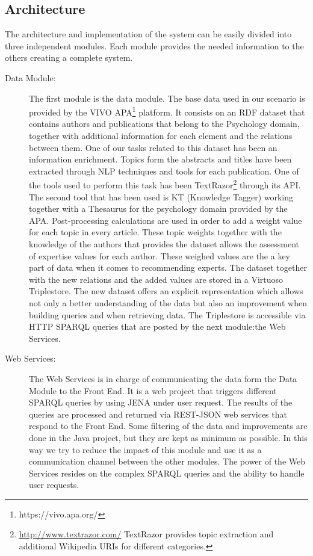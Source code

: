 \subsection{Architecture}
The architecture and implementation of the system can be easily divided into three independent modules. Each module provides the needed information to the others creating a complete system.
\begin{description}
  \item[Data Module:] The first module is the data module. The base data used in our scenario is provided by the VIVO APA\footnote{\url{}https://vivo.apa.org/} platform. It consists on an RDF dataset that contains authors and publications that belong to the Psychology domain, together with additional information for each element and the relations between them. One of our tasks related to this dataset has been an information enrichment. Topics form the abstracts and titles have been extracted through NLP techniques and tools for each publication. One of the tools used to perform this task has been TextRazor\footnote{\url{http://www.textrazor.com/} TextRazor provides topic extraction and additional Wikipedia URIs for different categories.} through its API. The second tool that has been used is KT (Knowledge Tagger) working together with a Thesaurus for the psychology domain provided by the APA. Post-processing calculations are used in order to add a weight value for each topic in every article. These topic weights together with the knowledge of the authors that provides the dataset allows the assessment of expertise values for each author. These weighed values are the a key part of data when it comes to recommending experts. The dataset together with the new relations and the added values are stored in a Virtuoso Triplestore. The new dataset offers an explicit representation which allows not only a better understanding of the data but also an improvement when building queries and when retrieving data. The Triplestore is accessible via HTTP SPARQL queries that are posted by the next module:the Web Services.
  \item[Web Services:] The Web Services is in charge of communicating the data form the Data Module to the Front End. It is a web project that triggers different SPARQL queries by using JENA under user request. The results of the queries are processed and returned via REST-JSON web services that respond to the Front End. Some filtering of the data and improvements are done in the Java project, but they are kept as minimum as possible. In this way we try to reduce the impact of this module and use it as a communication channel between the other modules. The power of the Web Services resides on the complex SPARQL queries and the ability to handle user requests.

\end{description}
